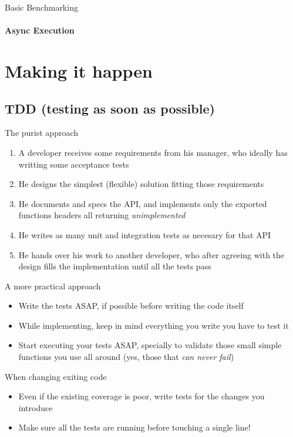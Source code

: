 \documentclass[]{beamer}
\begin{document}
\begin{frame}{Basic Benchmarking}
    \framesubtitle{Async Execution}
    
\end{frame}

\section*{Making it happen}
\label{making_it_happen}

\subsection*{TDD (testing as soon as possible)}
\label{tdd}


\begin{frame}{The purist approach}
    \begin{enumerate}
    \item A developer receives some requirements from his manager, who ideally has writting some acceptance tests
    \pause
    \item He designs the simplest (flexible) solution fitting those requirements
    \pause
    \item He documents and specs the API, and implements only the exported functions headers all returning \emph{unimplemented}
    \pause
    \item He writes as many unit and integration tests as necesary for that API
    \pause
    \item He hands over his work to another developer, who after agreeing with the design fills the implementation until
    all the tests pass
    \end{enumerate}
\end{frame}

\begin{frame}{A more practical approach}
    \begin{itemize}
    \item Write the tests ASAP, if possible before writing the code itself
    \pause
    \item While implementing, keep in mind everything you write you have to test it
    \pause
    \item Start executing your tests ASAP, specially to validate those small simple functions you use all around (yes,
    those that \emph{can never fail})
    \end{itemize}
    \pause
    When changing exiting code
    \begin{itemize}
    \item Even if the existing coverage is poor, write tests for the changes you introduce
    \pause
    \item Make sure all the tests are running before touching a single line!
    \end{itemize}
\end{frame}
\end{document}
